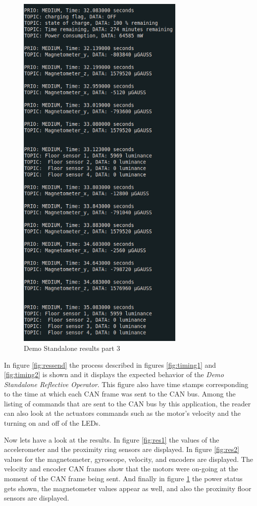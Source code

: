 \documentclass[12pt]{report}%
\begin{document}
\begin{figure}[ht]
	\centering
	\includegraphics[width=\textwidth, height=18cm]{standalone_3}
  	\caption{Demo Standalone results part 3}
  	\label{fig:res3}
\end{figure}

In figure \ref{fig:ressend} the process described in figures \ref{fig:timing1} and \ref{fig:timing2} is shown and it displays the expected behavior of the \textit{Demo Standalone Reflective Operator}. This figure also have time stamps corresponding to the time at which each CAN frame was sent to the CAN bus. Among the listing of commands that are sent to the CAN bus by this application, the reader can also look at the actuators commands such as the motor's velocity and the turning on and off of the LEDs.

Now lets have a look at the results. In figure \ref{fig:res1} the values of the accelerometer and the proximity ring sensors are displayed. In figure \ref{fig:res2} values for the magnetometer, gyroscope, velocity, and encoders are displayed. The velocity and encoder CAN frames show that the motors were on-going at the moment of the CAN frame being sent. And finally in figure \ref{fig:res3} the power status gets shown, the magnetometer values appear as well, and also the proximity floor sensors are displayed.
\end{document}
